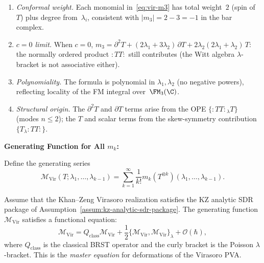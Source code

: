 \begin{remark}
\leavevmode
\begin{enumerate}
\item \emph{Conformal weight.} Each monomial in~\eqref{eq:vir-m3}
 has total weight~$2$ (spin of~$T$) plus degree from~$\lambda_i$,
 consistent with $|m_3| = 2-3 = -1$ in the bar complex.
\item \emph{$c = 0$ limit.} When $c = 0$,
 $m_3 = \partial^2 T + (2\lambda_1 + 3\lambda_2)\,\partial T
 + 2\lambda_2(2\lambda_1 + \lambda_2)\,T$:
 the normally ordered product $:TT:$ still contributes
 (the Witt algebra $\lambda$-bracket is not associative either).
\item \emph{Polynomiality.} The formula is polynomial
 in $\lambda_1, \lambda_2$ (no negative powers), reflecting
 locality of the FM integral over~$\FM_3(\C)$.
\item \emph{Structural origin.} The $\partial^2 T$ and
 $\partial T$ terms arise from the OPE $\{:TT:{}_\lambda T\}$
 (modes $n \le 2$); the $T$ and scalar terms from
 the skew-symmetry contribution $\{T_\lambda {:TT:}\}$.
\end{enumerate}
\end{remark}

\textbf{Generating Function for All $m_k$:}

Define the generating series
\begin{equation}
\mathcal{M}_{\text{Vir}}(T; \lambda_1, \ldots, \lambda_{k-1}) = \sum_{k=1}^\infty \frac{1}{k!} m_k(T^{\otimes k})(\lambda_1, \ldots, \lambda_{k-1}).
\end{equation}

\begin{theorem}
Assume that the Khan--Zeng Virasoro realization satisfies the KZ
analytic SDR package of
Assumption~\textup{\ref{assum:kz-analytic-sdr-package}}.
The generating function $\mathcal{M}_{\text{Vir}}$ satisfies a functional equation:
\begin{equation}
\mathcal{M}_{\text{Vir}} = Q_{\text{class}} \mathcal{M}_{\text{Vir}} + \frac{1}{2} \{\mathcal{M}_{\text{Vir}}, \mathcal{M}_{\text{Vir}}\}_\lambda + \mathcal{O}(\hbar),
\end{equation}
where $Q_{\text{class}}$ is the classical BRST operator and the curly bracket is the Poisson $\lambda$-bracket. This is the \emph{master equation} for deformations of the Virasoro PVA.
\end{theorem}

